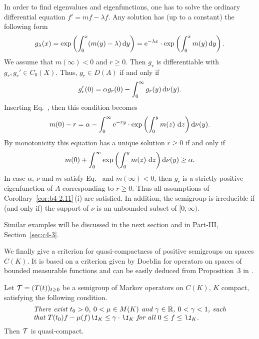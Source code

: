 \begin{example}
In order to find eigenvalues and eigenfunctions, one has to solve the ordinary differential equation $f' = mf - \lambda f$. 
Any solution has (up to a constant) the following form
\begin{equation}\label{eq:b4-2.9}
	g_{\lambda}(x) = \exp\left(\int_0^x(m(y) - \lambda)\mathop{}\!\mathrm{d}{y} \right) = \mathrm{e}^{-\lambda x} \cdot \exp\left(\int_0^x m(y) \mathop{}\!\mathrm{d}{y} \right) .
\end{equation}
We assume that $m(\infty) < 0$ and $r \geq 0$. 
Then $g_r$ is differentiable with $g_r, g_r' \in C_{0}(X)$. 
Thus, $g_r \in D(A)$ if and only if\/ 
%
\[
	g_r'(0) = \alpha g_r(0) - \int_0^{\infty} g_r(y) \mathop{}\!\mathrm{d}{\nu}(y) .
\]
%
Inserting Eq.~, then this condition becomes
\[
m(0) - r = \alpha - \int_0^{\infty} \mathrm{e}^{-ry} \cdot \exp\left(\int_{0}^{y}  m(z) \,\mathop{}\!\mathrm{d}{z}\right)\mathop{}\!\mathrm{d}{\nu}(y) .
\]
By monotonicity this equation has a unique solution $r \geq 0$ if and only if
\begin{equation}\label{eq:b4-2.10}
	m(0) + \int_0^{\infty} \exp\left(\int_0^y m(z) \,\diff{z}\right)\diff{\nu}(y) \geq \alpha .
\end{equation}
In case $\alpha$, $\nu$ and $m$ satisfy Eq.~ and $m(\infty) < 0$, then $g_r$ is a strictly positive eigenfunction of\/ $A$ corresponding to $r \geq 0$. 
Thus all assumptions of Corollary~\ref{cor:b4-2.11}\,(i) are satisfied. 
In addition, the semigroup is irreducible if (and only if) the support of\/ $\nu$ is an unbounded subset of\/ $[0,\infty)$.
\end{example}
Similar examples will be discussed in the next section and in  Part-III, Section~\ref{sec:c4-3}.

We finally give a criterion for quasi-compactness of positive semigroups on spaces $C(K)$. 
It is based on a criterion given by Doeblin for operators on spaces of bounded measurable functions and can be easily deduced from  Proposition~3 in \textcite{lotz:1981}.
\begin{proposition}\label{prop:b4-2.13}
%
%
	Let $\TT = (T(t))_{t \geq 0}$ be a semigroup of Markov operators on $C(K)$, $K$ compact, satisfying the following condition.
\begin{equation*}\label{eq:b4-2.12}	
\begin{minipage}{.8\textwidth}
%	
\textit{There exist $t_{0} > 0$, $ 0 < \mu \in M(K)$ and  $\gamma \in \R$, $0 < \gamma < 1 $, 
such that  $T(t_{0})f - \mu(f)\1_K \leq \gamma \cdot \1_K$  for all   $0 \leq f \leq \1_K$.}
%
\end{minipage}
\end{equation*}
Then $\mathcal{T}$ is quasi-compact.
\end{proposition}
